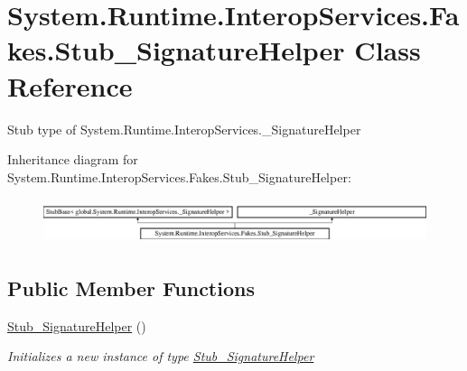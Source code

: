 \hypertarget{class_system_1_1_runtime_1_1_interop_services_1_1_fakes_1_1_stub___signature_helper}{\section{System.\-Runtime.\-Interop\-Services.\-Fakes.\-Stub\-\_\-\-Signature\-Helper Class Reference}
\label{class_system_1_1_runtime_1_1_interop_services_1_1_fakes_1_1_stub___signature_helper}
}


Stub type of System.\-Runtime.\-Interop\-Services.\-\_\-\-Signature\-Helper 


Inheritance diagram for System.\-Runtime.\-Interop\-Services.\-Fakes.\-Stub\-\_\-\-Signature\-Helper\-:\begin{figure}[H]
\begin{center}
\leavevmode
\includegraphics[height=1.336515cm]{class_system_1_1_runtime_1_1_interop_services_1_1_fakes_1_1_stub___signature_helper}
\end{center}
\end{figure}
\subsection*{Public Member Functions}
\begin{DoxyCompactItemize}
\item 
\hyperlink{class_system_1_1_runtime_1_1_interop_services_1_1_fakes_1_1_stub___signature_helper_aa0183992d0b389633638a24f0136611c}{Stub\-\_\-\-Signature\-Helper} ()
\begin{DoxyCompactList}\small\item\em Initializes a new instance of type \hyperlink{class_system_1_1_runtime_1_1_interop_services_1_1_fakes_1_1_stub___signature_helper}{Stub\-\_\-\-Signature\-Helper}\end{DoxyCompactList}\end{DoxyCompactItemize}
